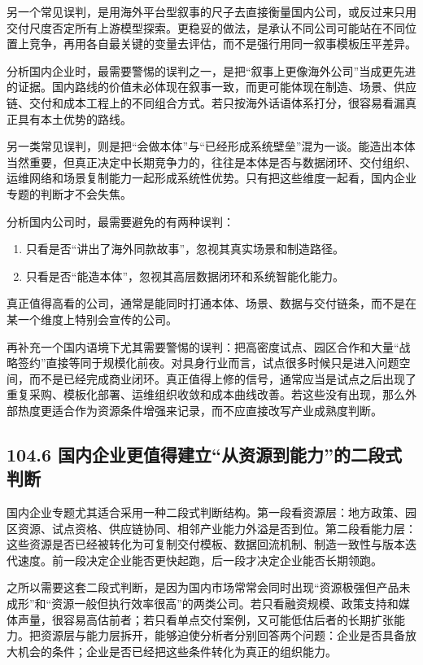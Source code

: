 另一个常见误判，是用海外平台型叙事的尺子去直接衡量国内公司，或反过来只用交付尺度否定所有上游模型探索。更稳妥的做法，是承认不同公司可能站在不同位置上竞争，再用各自最关键的变量去评估，而不是强行用同一叙事模板压平差异。

分析国内企业时，最需要警惕的误判之一，是把“叙事上更像海外公司”当成更先进的证据。国内路线的价值未必体现在叙事一致，而更可能体现在制造、场景、供应链、交付和成本工程上的不同组合方式。若只按海外话语体系打分，很容易看漏真正具有本土优势的路线。

另一类常见误判，则是把“会做本体”与“已经形成系统壁垒”混为一谈。能造出本体当然重要，但真正决定中长期竞争力的，往往是本体是否与数据闭环、交付组织、运维网络和场景复制能力一起形成系统性优势。只有把这些维度一起看，国内企业专题的判断才不会失焦。

分析国内公司时，最需要避免的有两种误判：

\begin{enumerate}
\item 只看是否“讲出了海外同款故事”，忽视其真实场景和制造路径。
\item 只看是否“能造本体”，忽视其高层数据闭环和系统智能化能力。
\end{enumerate}

真正值得高看的公司，通常是能同时打通本体、场景、数据与交付链条，而不是在某一个维度上特别会宣传的公司。

再补充一个国内语境下尤其需要警惕的误判：把高密度试点、园区合作和大量“战略签约”直接等同于规模化前夜。对具身行业而言，试点很多时候只是进入问题空间，而不是已经完成商业闭环。真正值得上修的信号，通常应当是试点之后出现了重复采购、模板化部署、运维组织收敛和成本曲线改善。若这些没有出现，那么外部热度更适合作为资源条件增强来记录，而不应直接改写产业成熟度判断。

\subsection*{104.6 国内企业更值得建立“从资源到能力”的二段式判断}


国内企业专题尤其适合采用一种二段式判断结构。第一段看资源层：地方政策、园区资源、试点资格、供应链协同、相邻产业能力外溢是否到位。第二段看能力层：这些资源是否已经被转化为可复制交付模板、数据回流机制、制造一致性与版本迭代速度。前一段决定企业能否更快起跑，后一段才决定企业能否长期领跑。

之所以需要这套二段式判断，是因为国内市场常常会同时出现“资源极强但产品未成形”和“资源一般但执行效率很高”的两类公司。若只看融资规模、政策支持和媒体声量，很容易高估前者；若只看单点交付案例，又可能低估后者的长期扩张能力。把资源层与能力层拆开，能够迫使分析者分别回答两个问题：企业是否具备放大机会的条件；企业是否已经把这些条件转化为真正的组织能力。

